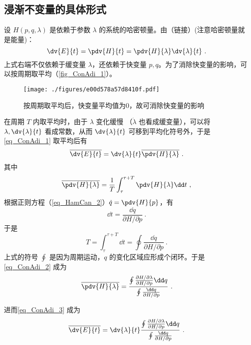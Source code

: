 \subsection{浸渐不变量的具体形式}
设 $H(p,q,\lambda)$ 是依赖于参数 $\lambda$ 的系统的哈密顿量。由（链接）(注意哈密顿量就是能量)：
\begin{equation}\label{eq_ConAdi_1}
\dv{E}{t}=\pdv{H}{t}=\pdv{H}{\lambda}\dv{\lambda}{t}~.
\end{equation}
上式右端不仅依赖于缓变量 $\lambda$，还依赖于快变量 $p,q$。为了消除快变量的影响，可以按周期取平均（\autoref{fig_ConAdi_1}）。
\begin{figure}[ht]
\centering
\texttt{[image: ./figures/e00d578a57d8410f.pdf]}
\caption{按周期取平均后，快变量平均值为0，故可消除快变量的影响} \label{fig_ConAdi_1}
\end{figure}
在周期 $T$ 内取平均时，由于 $\lambda$ 变化缓慢 （$\dot\lambda$ 也看成缓变量），可以将 $\lambda,\dv{\lambda}{t}$ 看成常数，从而 $\dv{\lambda}{t}$ 可移到平均化符号外，于是\autoref{eq_ConAdi_1} 取平均后有
\begin{equation}\label{eq_ConAdi_3}
\overline{\dv{E}{t}}=\dv{\lambda}{t}\overline{\pdv{H}{\lambda}}~.
\end{equation}
其中
\begin{equation}\label{eq_ConAdi_2}
\overline{\pdv{H}{\lambda}}=\frac{1}{T}\int_\tau^{\tau+T}\pdv{H}{\lambda}\dd t~,
\end{equation}
根据正则方程（\autoref{eq_HamCan_2}）$\dot q=\pdv{H}{p}$，有
\begin{equation}
\dd t=\frac{\dd q}{\partial{H}/\partial{p}}~.
\end{equation}
于是
\begin{equation}
T=\int_{\tau}^{\tau+T}\dd t=\oint\frac{\dd q}{\partial{H}/\partial{p}}~.
\end{equation}
上式的符号 $\oint$ 是因为周期运动，$q$ 的变化区域应形成个闭环。于是\autoref{eq_ConAdi_2} 成为
\begin{equation}
\overline{\pdv{H}{\lambda}}=\frac{\oint\frac{\partial{H}/\partial{\lambda}}{\partial{H}/\partial{p}}\dd q}
{\oint\frac{\dd q}{\partial{H}/\partial{p}}}~.
\end{equation}
 
进而\autoref{eq_ConAdi_3} 成为
\begin{equation}\label{eq_ConAdi_5}
\overline{\dv{E}{t}}=\dv{\lambda}{t}
\frac{\oint\frac{\partial{H}/\partial{\lambda}}{\partial{H}/\partial{p}}\dd q}
{\oint\frac{\dd q}{\partial{H}/\partial{p}}}~.
\end{equation}

